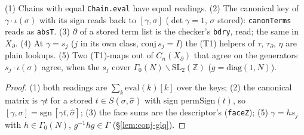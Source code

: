 \begin{theorem}\label{thm:etaread}
  \leanok
  (1) Chains with equal \texttt{Chain.eval} have equal readings. (2) The canonical key of $\gamma\cdot\iota(\sigma)$ with its sign reads
  back to $[\gamma,\sigma]$ ($\det\gamma=1$, $\sigma$ stored): \texttt{canonTerms} reads as \texttt{absT}. (3) $\partial$ of a stored term
  list is the checker's \texttt{bdry}, read; the same in $X_\partial$. (4) At $\gamma=s_j$ ($j$ in its own class, $\mathrm{conj}\,s_j=I$)
  the (T1) helpers of $\tau$, $\tau_\partial$, $\eta$ are plain lookups. (5) Two (T1)-maps out of $C_n(X_\partial)$ that agree on the
  generators $s_j\cdot\iota(\sigma)$ agree, when the $s_j$ cover $\Gamma_0(N)\backslash\mathrm{SL}_2(\mathbb Z)$ ($g=\mathrm{diag}(1,N)$).
\end{theorem}
\begin{proof}
  \leanok
  (1) both readings are $\sum_k \mathrm{eval}(k)[k]$ over the keys; (2) the canonical matrix is $\gamma t$ for a stored
  $t\in S(\sigma,\hat\sigma)$ with sign $\mathrm{permSign}(t)$, so $[\gamma,\sigma]=\mathrm{sgn}\,[\gamma t,\hat\sigma]$; (3) the face sums
  are the descriptor's (\texttt{faceZ}); (5) $\gamma=h s_j$ with $h\in\Gamma_0(N)$, $g^{-1}hg\in\Gamma$ (\S\ref{lem:conj-glq}).
\end{proof}

